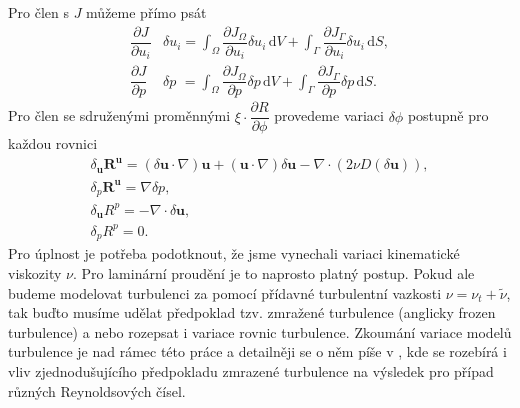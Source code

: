 Pro člen s $ J $ můžeme přímo psát
\begin{align}
\dfrac{\partial J}{\partial u_i}& \delta u_i = \int_{\Omega} \dfrac{\partial J_{\Omega}}{\partial u_i} \delta u_i \, \mathrm{d}V + \int_{\Gamma} \dfrac{\partial J_{\Gamma}}{\partial u_i} \delta u_i \, \mathrm{d}S, \\
\dfrac{\partial J}{\partial p} &\delta p \,\,= \int_{\Omega} \dfrac{\partial J_{\Omega}}{\partial p} \delta p  \, \mathrm{d}V + \int_{\Gamma} \dfrac{\partial J_{\Gamma}}{\partial p} \delta p  \, \mathrm{d}S.
\end{align}
Pro člen se sdruženými proměnnými $ \xi \cdot \dfrac{\partial R}{\partial \phi} $ provedeme variaci $ \delta\phi $ postupně pro každou rovnici
\begin{gather*}
\delta_\mathbf{u} \mathbf{R^u}=
(\delta \mathbf{u}\cdot \nabla )\mathbf{u} + (\mathbf{u}\cdot \nabla )\delta\mathbf{u} - \nabla \cdot (2\nu D(\delta \mathbf{u}) ) ,\\
\delta_p \mathbf{R^u}= \nabla \delta p,\\
\delta_\mathbf{u}R^p = -\nabla \cdot \delta \mathbf{u} ,\\
\delta_p R^p = 0.
\end{gather*}
Pro úplnost je potřeba podotknout, že jsme vynechali variaci kinematické viskozity $ \nu $. 
Pro laminární proudění je to naprosto platný postup. 
Pokud ale budeme modelovat turbulenci za pomocí přídavné turbulentní vazkosti $ \nu = \nu_t + \widetilde{\nu} $, tak buďto musíme udělat předpoklad tzv. zmražené turbulence (anglicky frozen turbulence) a nebo rozepsat i variace rovnic turbulence. Zkoumání variace modelů turbulence je nad rámec této práce a detailněji se o něm píše v \cite{zymaris2009continuous}, kde se rozebírá i vliv zjednodušujícího předpokladu zmrazené turbulence na výsledek pro případ různých Reynoldsových čísel. 

